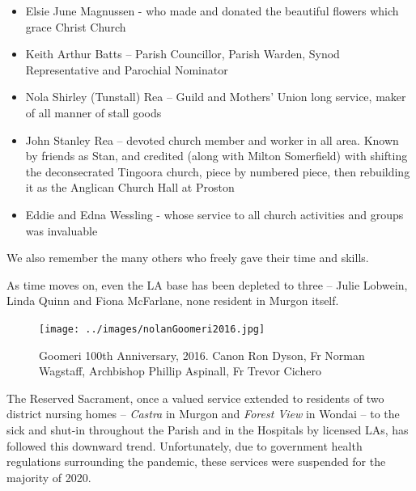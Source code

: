 \begin{itemize}

\item

  Elsie June Magnussen - who made and donated the beautiful flowers which grace Christ Church

\item

  Keith Arthur Batts -- Parish Councillor, Parish Warden, Synod Representative and Parochial Nominator

\item

  Nola Shirley (Tunstall) Rea -- Guild and Mothers' Union long service, maker of all manner of stall goods

\item

  John Stanley Rea -- devoted church member and worker in all area. Known by friends as Stan, and credited (along with Milton Somerfield) with shifting the deconsecrated Tingoora church, piece by numbered piece, then rebuilding it as the Anglican Church Hall at Proston

\item

  Eddie and Edna Wessling - whose service to all church activities and groups was invaluable

\end{itemize}



We also remember the many others who freely gave their time and skills.



As time moves on, even the LA base has been depleted to three -- Julie Lobwein, Linda Quinn and Fiona McFarlane, none resident in Murgon itself.









\begin{figure}[!htb]
\begin{center}
\texttt{[image: ../images/nolanGoomeri2016.jpg]}
\caption{Goomeri 100th Anniversary, 2016. Canon Ron Dyson, Fr Norman Wagstaff, Archbishop Phillip Aspinall, Fr Trevor Cichero}
\end{center}
\end{figure}




The Reserved Sacrament, once a valued service extended to residents of two district nursing homes -- \emph{Castra} in Murgon and \emph{Forest View} in Wondai -- to the sick and shut-in throughout the Parish and in the Hospitals by licensed LAs, has followed this downward trend. Unfortunately, due to government health regulations surrounding the pandemic, these services were suspended for the majority of 2020.



